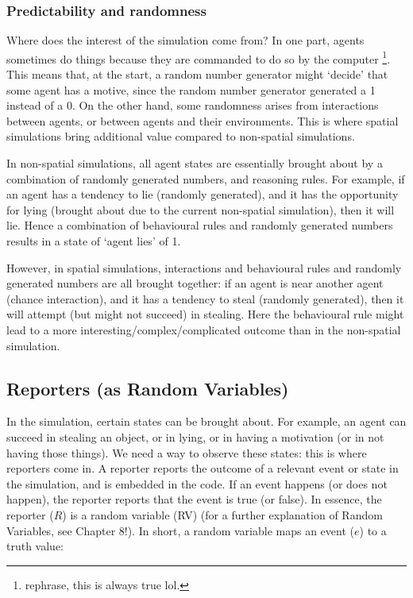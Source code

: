 \subsubsection{Predictability and randomness}
Where does the interest of the simulation come from? In one part, agents sometimes do things because they are commanded to do so by the computer \footnote{rephrase, this is always true lol.}. This means that, at the start, a random number generator might `decide' that some agent has a motive, since the random number generator generated a 1 instead of a 0. On the other hand, some randomness arises from interactions between agents, or between agents and their environments. This is where spatial simulations bring additional value compared to non-spatial simulations.

 In non-spatial simulations, all agent states are essentially brought about by a combination of randomly generated numbers, and reasoning rules. For example, if an agent has a tendency to lie (randomly generated), and it has the opportunity for lying (brought about due to the current non-spatial simulation), then it will lie. Hence a combination of behavioural rules and randomly generated numbers results in a state of `agent lies' of 1.
 
 However, in spatial simulations, interactions and behavioural rules and randomly generated numbers are all brought together: if an agent is near another agent (chance interaction), and it has a tendency to steal (randomly generated), then it will attempt (but might not succeed) in stealing. Here the behavioural rule might lead to a more interesting/complex/complicated outcome than in the non-spatial simulation.
 


\subsection{Reporters (as Random Variables)}

In the simulation, certain states can be brought about. For example, an agent can succeed in stealing an object, or in lying, or in having a motivation (or in not having those things). We need a way to observe these states: this is where reporters come in. A reporter reports the outcome of a relevant event or state in the simulation, and is embedded in the code. If an event happens (or does not happen), the reporter reports that the event is true (or false). In essence, the reporter ($R$) is a random variable (RV) (for a further explanation of Random Variables, see Chapter 8!). In short, a random variable maps an event ($e$) to a truth value:

